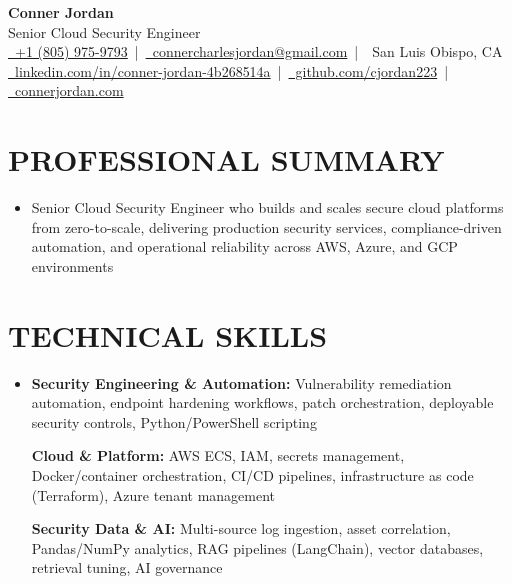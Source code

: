 \documentclass[letterpaper,10pt]{article}
\newcommand{\resumeSubHeadingListStart}{\begin{itemize}[leftmargin=0in,label={}]}
\newcommand{\resumeSubHeadingListEnd}{\end{itemize}}
\begin{document}
\begin{center}
  {\Huge \textbf{Conner Jordan}}\\[0pt]
  {\Large Senior Cloud Security Engineer}\\[0pt]
  \href{tel:+18059759793}{\faPhone\ +1 (805) 975-9793} \,|\, 
  \href{mailto:connercharlesjordan@gmail.com}{\faEnvelope\ connercharlesjordan@gmail.com} \,|\, 
  \faMapMarker\ San Luis Obispo, CA \\[-2pt]
  \href{https://www.linkedin.com/in/conner-jordan-4b268514a/}{\faLinkedin\ linkedin.com/in/conner-jordan-4b268514a}
  \,|\, \href{https://github.com/cjordan223}{\faGithub\ github.com/cjordan223}
  \,|\, \href{https://connerjordan.com/}{\faGlobe\ connerjordan.com}
\end{center}

\vspace{4pt}

\section{PROFESSIONAL SUMMARY}
\vspace{8pt}
\resumeSubHeadingListStart
\item {\small
Senior Cloud Security Engineer who builds and scales secure cloud platforms from zero-to-scale, delivering production security services, compliance-driven automation, and operational reliability across AWS, Azure, and GCP environments}
\resumeSubHeadingListEnd
\vspace{6pt}

\section{TECHNICAL SKILLS}
\vspace{6pt}
\resumeSubHeadingListStart
\item {\small
\textbf{Security Engineering \& Automation:} Vulnerability remediation automation, endpoint hardening workflows, patch orchestration, deployable security controls, Python/PowerShell scripting

\vspace{3pt}
\textbf{Cloud \& Platform:} AWS ECS, IAM, secrets management, Docker/container orchestration, CI/CD pipelines, infrastructure as code (Terraform), Azure tenant management

\vspace{3pt}
\textbf{Security Data \& AI:} Multi-source log ingestion, asset correlation, Pandas/NumPy analytics, RAG pipelines (LangChain), vector databases, retrieval tuning, AI governance
}
\resumeSubHeadingListEnd
\vspace{6pt}
\end{document}
